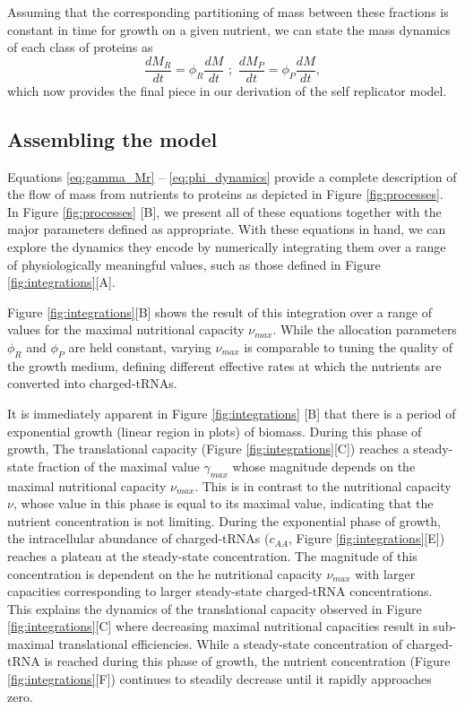 Assuming that the corresponding partitioning 
of mass between these fractions is constant in time for growth on a given nutrient, 
we can state the mass dynamics of each class of proteins as 
\begin{equation}
\frac{dM_R}{dt} = \phi_R \frac{dM}{dt} \,\,;\,\, \frac{dM_P}{dt} = \phi_P \frac{dM}{dt},
\label{eq:phi_dynamics}
\end{equation}
which now provides the final piece in our derivation of the self replicator model.

\subsection*{Assembling the model}
Equations \ref{eq:gamma_Mr} -- \ref{eq:phi_dynamics} provide a 
complete description of the flow of mass from nutrients to proteins as depicted in 
Figure \ref{fig:processes}. In Figure \ref{fig:processes} [B], we present all 
of these equations together with the major parameters defined as appropriate. With 
these equations in hand, we can explore the dynamics they encode by numerically 
integrating them over a range of physiologically meaningful values, such as 
those defined in Figure \ref{fig:integrations}[A]. 

Figure \ref{fig:integrations}[B] shows the result of this integration over a range 
of values for the maximal nutritional capacity $\nu_{max}$. While the allocation 
parameters $\phi_R$ and $\phi_P$ are held constant, varying $\nu_{max}$ is comparable 
to tuning the quality of the growth medium, defining different effective rates at which 
the nutrients are converted into charged-tRNAs. 

It is immediately apparent in Figure \ref{fig:integrations} [B] that there is 
a period of exponential growth (linear region in plots) of biomass. During this phase of growth, 
The translational capacity (Figure \ref{fig:integrations}[C]) reaches a steady-state 
fraction of the maximal value $\gamma_{max}$ whose magnitude depends on the maximal nutritional capacity $\nu_{max}$. This 
is in contrast to the nutritional capacity $\nu$, whose value in this phase is equal to its maximal value,
indicating that the nutrient concentration is not limiting.  During the exponential phase of growth, 
the intracellular abundance of charged-tRNAs ($c_{AA}$, Figure \ref{fig:integrations}[E]) reaches a plateau 
at the steady-state concentration. The magnitude of this concentration is dependent on the 
he nutritional capacity $\nu_{max}$ with larger capacities corresponding to larger 
steady-state charged-tRNA concentrations. This explains the dynamics of the translational 
capacity observed in Figure \ref{fig:integrations}[C] where decreasing maximal nutritional 
capacities result in sub-maximal translational efficiencies.  While a steady-state concentration of 
charged-tRNA is reached during this phase of growth, the nutrient concentration 
(Figure \ref{fig:integrations}[F]) continues to steadily decrease until it rapidly approaches zero.

